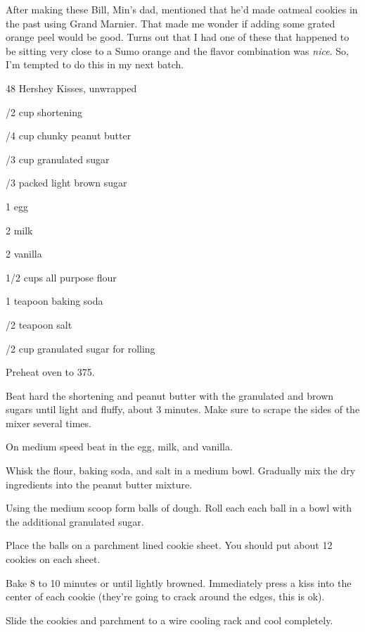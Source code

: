 \begin{Tip}
    {After making these Bill, Min's dad, mentioned that he'd made oatmeal cookies in the past using
        Grand Marnier. That made me wonder if adding some grated orange peel would be good. Turns out that
        I had one of these that happened to be sitting very close to a Sumo orange and the flavor
        combination was \emph{nice}. So, I'm tempted to do this in my next batch.}
\end{Tip}

%
%
%
%
\newpage



\begin{IngredientsAndSteps}
    \ListIngredientsAndSteps
    {
        48 Hershey Kisses, unwrapped

        /2 cup shortening

        /4 cup chunky peanut butter

        /3 cup granulated sugar

        /3 packed light brown sugar

        1 egg

        2 \Tbl[s] milk

        2 \tsp[s] vanilla

        1/2 cups all purpose flour

        1 teapoon baking soda

        /2 teapoon salt

        /2 cup granulated sugar for rolling
    }
    {
        Preheat oven to 375\Degrees[F].

        Beat hard the shortening and peanut butter with the granulated and brown sugars
        until light and fluffy, about 3 minutes. Make sure to scrape the sides of the
        mixer several times.

        On medium speed beat in the egg, milk, and vanilla.

        Whisk the flour, baking soda, and salt in a medium bowl. Gradually mix the dry ingredients
        into the peanut butter mixture.

        Using the medium scoop form balls of dough. Roll each each ball in a bowl with the
        additional granulated sugar.

        Place the balls on a parchment lined cookie sheet. You should put about 12 cookies
        on each sheet.

        Bake 8 to 10 minutes or until lightly browned. Immediately press a kiss into the center
        of each cookie (they're going to crack around the edges, this is ok).

        Slide the cookies and parchment to a wire cooling rack and cool completely.
    }
\end{IngredientsAndSteps}

